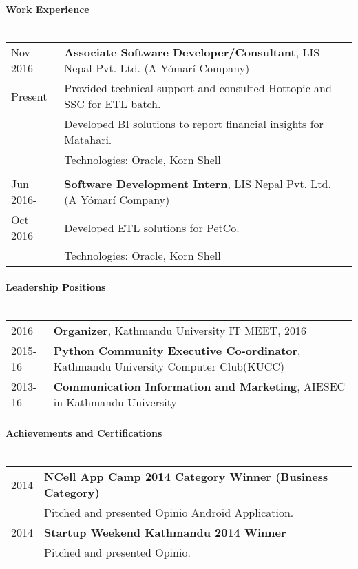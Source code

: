 \documentclass[letterpaper,10pt,oneside]{article}
\begin{document}
\paragraph{\large{Work Experience}\\\\}
\noindent \begin{tabular}{l l}
 Nov 2016-    & \textbf{Associate Software Developer/Consultant}, LIS Nepal Pvt. Ltd. (A Yómarí Company) \\
 Present      & Provided technical support and consulted Hottopic and SSC for ETL batch. \\
              & Developed BI solutions to report financial insights for Matahari. \\
              & Technologies: Oracle, Korn Shell\\
              & \\
 Jun 2016-    & \textbf{Software Development Intern}, LIS Nepal Pvt. Ltd. (A Yómarí Company) \\
 Oct 2016     & Developed ETL solutions for PetCo. \\
              & Technologies: Oracle, Korn Shell\\
\end{tabular}

\paragraph{\large{Leadership Positions}\\\\}
\noindent \begin{tabular}{l l}
 2016       & \textbf{Organizer}, Kathmandu University IT MEET, 2016 \\
 2015-16    & \textbf{Python Community Executive Co-ordinator}, Kathmandu University Computer Club(KUCC) \\
 2013-16    & \textbf{Communication Information and Marketing}, AIESEC in Kathmandu University \\
\end{tabular}


\paragraph{\large{Achievements and Certifications}\\\\}
\noindent \begin{tabular}{l l}
 2014    & \textbf{NCell App Camp 2014 Category Winner (Business Category)} \\
     & Pitched and presented Opinio Android Application. \\
 2014    & \textbf{Startup Weekend Kathmandu 2014 Winner} \\
     & Pitched and presented Opinio. \\
\end{tabular}
\end{document}
